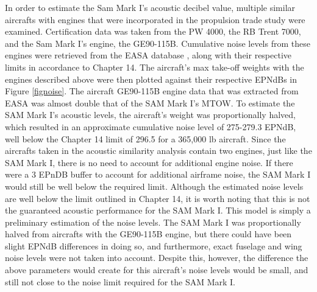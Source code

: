 In order to estimate the Sam Mark I's acoustic decibel value, multiple similar aircrafts with engines that were incorporated in the propulsion trade study were examined. Certification data was taken from the PW 4000, the RB Trent 7000, and the Sam Mark I's engine, the GE90-115B. Cumulative noise levels from these engines were retrieved from the EASA database \cite{easa}, along with their respective limits in accordance to Chapter 14. The aircraft's max take-off weights with the engines described above were then plotted against their respective EPNdBs in Figure \ref{fignoise}. The aircraft GE90-115B engine data that was extracted from EASA \cite{easa} was almost double that of the SAM Mark I's MTOW. To estimate the SAM Mark I's acoustic levels, the aircraft's weight was proportionally halved, which resulted in an approximate cumulative noise level of 275-279.3 EPNdB, well below the Chapter 14 limit of 296.5 for a 365,000 lb aircraft. Since the aircrafts taken in the acoustic similarity analysis contain two engines, just like the SAM Mark I, there is no need to account for additional engine noise. If there were a 3 EPnDB buffer to account for additional airframe noise, the SAM Mark I would still be well below the required limit. Although the estimated noise levels are well below the limit outlined in Chapter 14, it is worth noting that this is not the guaranteed acoustic performance for the SAM Mark I. This model is simply a preliminary estimation of the noise levels. The SAM Mark I was proportionally halved from aircrafts with the GE90-115B engine, but there could have been slight EPNdB differences in doing so, and furthermore, exact fuselage and wing noise levels were not taken into account. Despite this, however, the difference the above parameters would create for this aircraft's noise levels would be small, and still not close to the noise limit required for the SAM Mark I. 